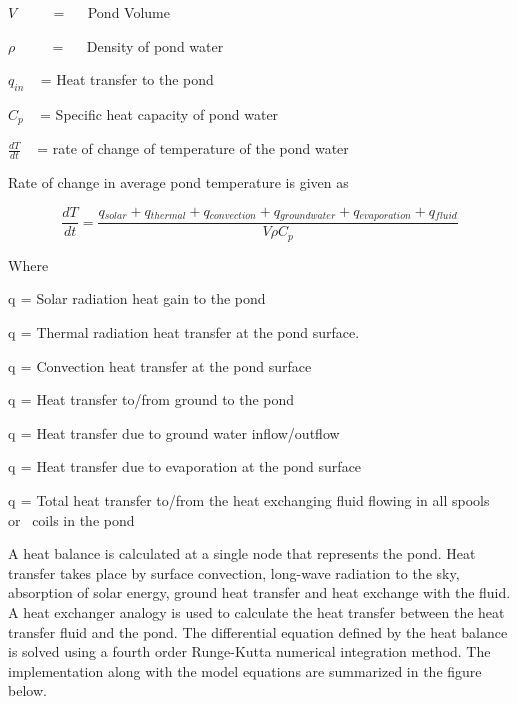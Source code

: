 \(V\) ~~~~ = ~~ Pond Volume

\(\rho\) ~~~~ = ~~ Density of pond water

\({q_{in}}\) ~ = Heat transfer to the pond

\(C{}_p\) ~ = Specific heat capacity of pond water

\(\frac{{dT}}{{dt}}\) ~ = rate of change of temperature of the pond water

Rate of change in average pond temperature is given as

\begin{equation}
\frac{{dT}}{{dt}} = \frac{{q{}_{solar} + q{}_{thermal} + q{}_{convection} + q{}_{groundwater} + q{}_{evaporation} + q{}_{fluid}}}{{V\rho C{}_p}}
\end{equation}

Where

q\(_{ }\) = Solar radiation heat gain to the pond

q\(_{ }\) = Thermal radiation heat transfer at the pond surface.

q\(_{ }\) = Convection heat transfer at the pond surface

q\(_{ }\) = Heat transfer to/from ground to the pond

q\(_{ }\) = Heat transfer due to ground water inflow/outflow

q\(_{ }\) = Heat transfer due to evaporation at the pond surface

q\(_{ }\) = Total heat transfer to/from the heat exchanging fluid flowing in all spools or~ coils in the pond

A heat balance is calculated at a single node that represents the pond. Heat transfer takes place by surface convection, long-wave radiation to the sky, absorption of solar energy, ground heat transfer and heat exchange with the fluid. A heat exchanger analogy is used to calculate the heat transfer between the heat transfer fluid and the pond. The differential equation defined by the heat balance is solved using a fourth order Runge-Kutta numerical integration method. The implementation along with the model equations are summarized in the figure below.

